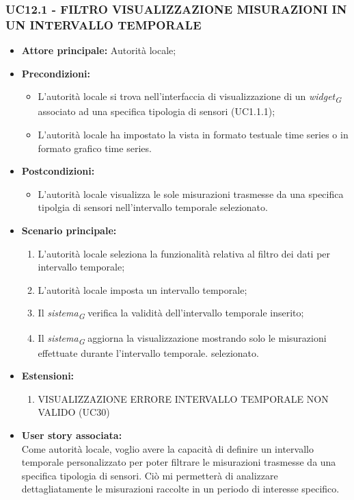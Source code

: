 \subsubsection{UC12.1 - FILTRO VISUALIZZAZIONE MISURAZIONI IN UN INTERVALLO TEMPORALE}
\begin{itemize}
    \item \textbf{Attore principale:} Autorità locale;
    \item \textbf{Precondizioni:}
        \begin{itemize}
            \item L'autorità locale si trova nell'interfaccia di visualizzazione di un \textit{widget}\textsubscript{\textit{G}} associato ad una specifica tipologia di sensori (UC1.1.1); 
            \item L'autorità locale ha impostato la vista in formato testuale time series o in formato grafico time series.
        \end{itemize}
    \item \textbf{Postcondizioni:}
        \begin{itemize}
            \item L'autorità locale visualizza le sole misurazioni trasmesse da una specifica tipolgia di sensori nell'intervallo temporale selezionato.
        \end{itemize}
    \item \textbf{Scenario principale:}
        \begin{enumerate}
            \item L'autorità locale seleziona la funzionalità relativa al filtro dei dati per intervallo temporale;
            \item L'autorità locale imposta un intervallo temporale;
            \item Il \textit{sistema}\textsubscript{\textit{G}} verifica la validità dell'intervallo temporale inserito;
            \item Il \textit{sistema}\textsubscript{\textit{G}} aggiorna la visualizzazione mostrando solo le misurazioni effettuate durante l'intervallo temporale. selezionato.
        \end{enumerate}
    \item \textbf{Estensioni:}
    \begin{enumerate}
        \item VISUALIZZAZIONE ERRORE INTERVALLO TEMPORALE NON VALIDO (UC30)
    \end{enumerate}
    \item \textbf{User story associata:} \\
        Come autorità locale, voglio avere la capacità di definire un intervallo temporale personalizzato per poter filtrare le misurazioni trasmesse da una specifica tipologia di sensori. Ciò mi permetterà di analizzare dettagliatamente le misurazioni raccolte in un periodo di interesse specifico.
\end{itemize}